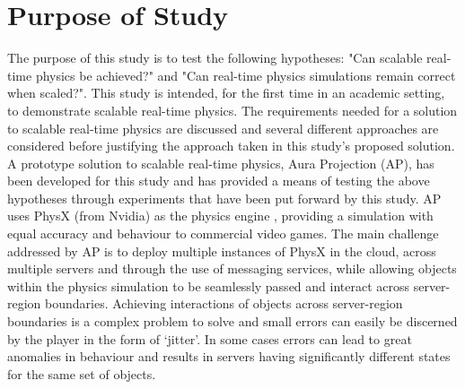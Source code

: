 \section{Purpose of Study}
The purpose of this study is to test the following hypotheses: "Can scalable real-time physics be achieved?" and "Can real-time physics simulations remain correct when scaled?". This study is intended, for the first time in an academic setting, to demonstrate scalable real-time physics. 
The requirements needed for a solution to scalable real-time physics are discussed and several different approaches are considered before justifying the approach taken in this study's proposed solution. 
A prototype solution to scalable real-time physics, Aura Projection (AP), has been developed for this study and has provided a means of testing the above hypotheses through experiments that have been put forward by this study.
AP uses PhysX (from Nvidia) as the physics engine \cite{PhysX}, providing a simulation with equal accuracy and behaviour to commercial video games. The main challenge addressed by AP is to deploy multiple instances of PhysX in the cloud, across multiple servers and through the use of messaging services, while allowing objects within the physics simulation to be seamlessly passed and interact across server-region boundaries. Achieving interactions of objects across server-region boundaries is a complex problem to solve and small errors can easily be discerned by the player in the form of `jitter'. In some cases errors can lead to great anomalies in behaviour and results in servers having significantly different states for the same set of objects.

